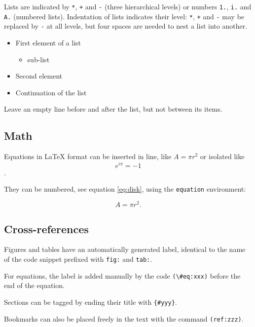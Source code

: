 \documentclass[fleqn,]{article} %
\providecommand{\tightlist}{%
  \setlength{\itemsep}{0pt}\setlength{\parskip}{0pt}}
\begin{document}
Lists are indicated by \texttt{*}, \texttt{+} and \texttt{-} (three hierarchical levels) or numbers \texttt{1.}, \texttt{i.} and \texttt{A.} (numbered lists).
Indentation of lists indicates their level: \texttt{*}, \texttt{+} and \texttt{-} may be replaced by \texttt{-} at all levels, but four spaces are needed to nest a list into another.

\begin{itemize}
\tightlist
\item
  First element of a list

  \begin{itemize}
  \tightlist
  \item
    sub-list
  \end{itemize}
\item
  Second element
\item
  Continuation of the list
\end{itemize}

Leave an empty line before and after the list, but not between its items.

\hypertarget{math}{%
\subsection{Math}\label{math}}

Equations in LaTeX format can be inserted in line, like \(A=\pi r^2\) or isolated like \[e^{i \pi} = -1\].

They can be numbered, see equation \eqref{eq:disk}, using the \texttt{equation} environment:

\begin{equation}
  A = \pi r^2.
  \label{eq:disk}
\end{equation}

\hypertarget{cross-references}{%
\subsection{Cross-references}\label{cross-references}}

Figures and tables have an automatically generated label, identical to the name of the code snippet prefixed with \texttt{fig:} and \texttt{tab:}.

For equations, the label is added manually by the code \texttt{(\textbackslash{}\#eq:xxx)} before the end of the equation.

Sections can be tagged by ending their title with \texttt{\{\#yyy\}}.

Bookmarks can also be placed freely in the text with the command \texttt{(ref:zzz)}.
\end{document}
